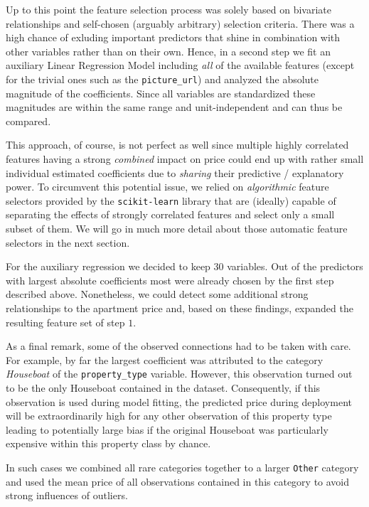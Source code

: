 \documentclass[12pt, letterpaper]{article}
\begin{document}
Up to this point the feature selection process was solely based on bivariate relationships and self-chosen (arguably arbitrary) selection criteria.
There was a high chance of exluding important predictors that shine in combination with other variables rather than on their own.
Hence, in a second step we fit an auxiliary Linear Regression Model including \emph{all} of the available features (except for the trivial ones such as the \verb|picture_url|) and analyzed the absolute magnitude of the coefficients.
Since all variables are standardized these magnitudes are within the same range and unit-independent and can thus be compared.

This approach, of course, is not perfect as well since multiple highly correlated features having a strong \emph{combined} impact on price could end up with rather small individual estimated coefficients due to \emph{sharing} their predictive / explanatory power.
To circumvent this potential issue, we relied on \emph{algorithmic} feature selectors provided by the \texttt{scikit-learn} library that are (ideally) capable of separating the effects of strongly correlated features and select only a small subset of them.
We will go in much more detail about those automatic feature selectors in the next section.

For the auxiliary regression we decided to keep $30$ variables.
Out of the predictors with largest absolute coefficients most were already chosen by the first step described above.
Nonetheless, we could detect some additional strong relationships to the apartment price and, based on these findings, expanded the resulting feature set of step $1$.

As a final remark, some of the observed connections had to be taken with care.
For example, by far the largest coefficient was attributed to the category \emph{Houseboat} of the \verb|property_type| variable.
However, this observation turned out to be the only Houseboat contained in the dataset.
Consequently, if this observation is used during model fitting, the predicted price during deployment will be extraordinarily high for any other observation of this property type leading to potentially large bias if the original Houseboat was particularly expensive within this property class by chance.

In such cases we combined all rare categories together to a larger \texttt{Other} category and used the mean price of all observations contained in this category to avoid strong influences of outliers.


\newpage



\end{document}
